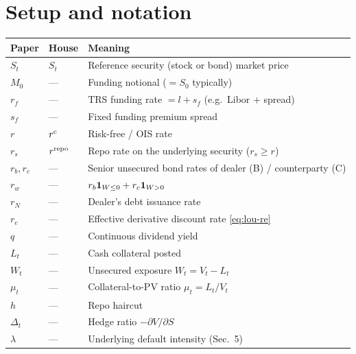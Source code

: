 \documentclass[11pt,a4paper]{article}
\begin{document}
\section{Setup and notation}

\begin{tabular}{@{}p{3cm}p{3.5cm}p{8.5cm}@{}}
\toprule
Paper             & House                       & Meaning \\
\midrule
$S_t$             & $S_t$                       & Reference security (stock or bond) market price \\
$M_0$             & ---                         & Funding notional ($= S_0$ typically) \\
$r_f$             & ---                         & TRS funding rate $= l + s_f$ (e.g.\ Libor + spread) \\
$s_f$             & ---                         & Fixed funding premium spread \\
$r$               & $r^{\mathrm{c}}$                     & Risk-free / OIS rate \\
$r_s$             & $r^{\mathrm{repo}}$                     & Repo rate on the underlying security ($r_s \ge r$) \\
$r_b, r_c$        & ---                         & Senior unsecured bond rates of dealer (B) / counterparty (C) \\
$r_w$             & ---                         & $r_b \mathbf{1}_{W \le 0} + r_c \mathbf{1}_{W > 0}$ \\
$r_N$             & ---                         & Dealer's debt issuance rate \\
$r_e$             & ---                         & Effective derivative discount rate \eqref{eq:lou-re} \\
$q$               & ---                         & Continuous dividend yield \\
$L_t$             & ---                         & Cash collateral posted \\
$W_t$             & ---                         & Unsecured exposure $W_t = V_t - L_t$ \\
$\mu_t$           & ---                         & Collateral-to-PV ratio $\mu_t = L_t / V_t$ \\
$h$               & ---                         & Repo haircut \\
$\Delta_t$        & ---                         & Hedge ratio $-\partial V / \partial S$ \\
$\lambda$         & ---                         & Underlying default intensity (Sec.\ 5) \\

\end{tabular}
\end{document}
